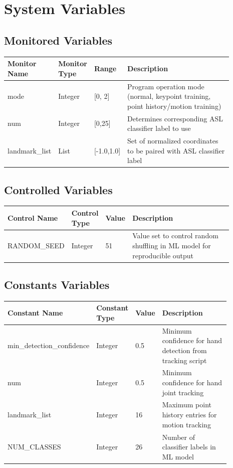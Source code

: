 \documentclass[12pt, titlepage]{article}
\begin{document}
\section{System Variables}
\subsection{Monitored Variables}

\renewcommand{\arraystretch}{1.2}
\noindent \begin{tabularx}{\textwidth}{p{0.15\linewidth}|p{0.12\linewidth}|p{0.12\linewidth}|p{0.5\linewidth}}
\toprule
\textbf{Monitor Name} & \textbf{Monitor Type} & \textbf{Range} & \textbf{Description}\\
\midrule
mode & Integer & [0, 2] & Program operation mode (normal, keypoint training, point history/motion training)\\
\hline
num & Integer & [0,25] & Determines corresponding ASL classifier label to use\\
\hline
landmark\_list & List & [-1.0,1.0] & Set of normalized coordinates to be paired with ASL classifier label\\
\bottomrule
\end{tabularx}

\subsection{Controlled Variables}

\renewcommand{\arraystretch}{1.2}
\noindent \begin{tabularx}{\textwidth}{p{0.2\linewidth}|p{0.12\linewidth}|p{0.12\linewidth}|p{0.45\linewidth}}
\toprule
\textbf{Control Name} & \textbf{Control Type} & \textbf{Value} & \textbf{Description}\\
\midrule
RANDOM\_SEED & Integer & 51 & Value set to control random shuffling in ML model for reproducible output\\
\bottomrule
\end{tabularx}

\subsection{Constants Variables}

\renewcommand{\arraystretch}{1.2}
\noindent \begin{tabularx}{\textwidth}{p{0.28\linewidth}|p{0.12\linewidth}|p{0.08\linewidth}|p{0.4\linewidth}}
\toprule
\textbf{Constant Name} & \textbf{Constant Type} & \textbf{Value} & \textbf{Description}\\
\midrule
min\_detection\_confidence & Integer & 0.5 & Minimum confidence for hand detection from tracking script\\
\hline
num & Integer & 0.5 & Minimum confidence for hand joint tracking\\
\hline
landmark\_list & Integer & 16 & Maximum point history entries for motion tracking\\
\hline
NUM\_CLASSES & Integer & 26 & Number of classifier labels in ML model\\
\bottomrule
\end{tabularx}
\end{document}
